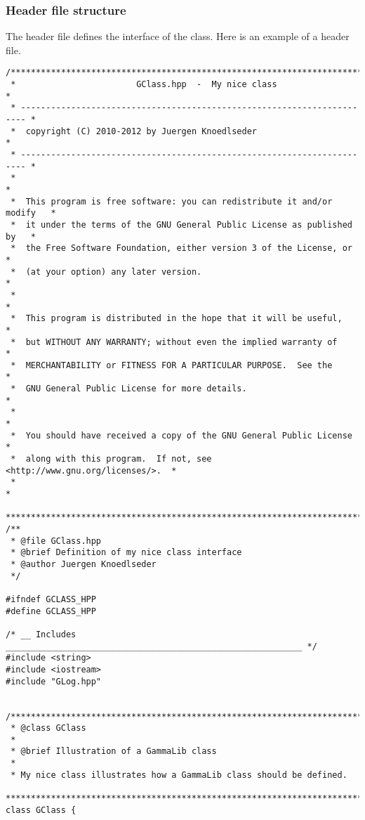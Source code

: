 \documentclass{article}[12pt,a4]
\begin{document}
\subsubsection{Header file structure}
\label{sec:header}

The header file defines the interface of the class.
Here is an example of a header file.
\begin{verbatim}
/***************************************************************************
 *                        GClass.hpp  -  My nice class                     *
 * ----------------------------------------------------------------------- *
 *  copyright (C) 2010-2012 by Juergen Knoedlseder                         *
 * ----------------------------------------------------------------------- *
 *                                                                         *
 *  This program is free software: you can redistribute it and/or modify   *
 *  it under the terms of the GNU General Public License as published by   *
 *  the Free Software Foundation, either version 3 of the License, or      *
 *  (at your option) any later version.                                    *
 *                                                                         *
 *  This program is distributed in the hope that it will be useful,        *
 *  but WITHOUT ANY WARRANTY; without even the implied warranty of         *
 *  MERCHANTABILITY or FITNESS FOR A PARTICULAR PURPOSE.  See the          *
 *  GNU General Public License for more details.                           *
 *                                                                         *
 *  You should have received a copy of the GNU General Public License      *
 *  along with this program.  If not, see <http://www.gnu.org/licenses/>.  *
 *                                                                         *
 ***************************************************************************/
/**
 * @file GClass.hpp
 * @brief Definition of my nice class interface
 * @author Juergen Knoedlseder
 */

#ifndef GCLASS_HPP
#define GCLASS_HPP

/* __ Includes ___________________________________________________________ */
#include <string>
#include <iostream>
#include "GLog.hpp"


/***********************************************************************//**
 * @class GClass
 *
 * @brief Illustration of a GammaLib class
 *
 * My nice class illustrates how a GammaLib class should be defined.
 ***************************************************************************/
class GClass {


\end{verbatim}
\end{document}
